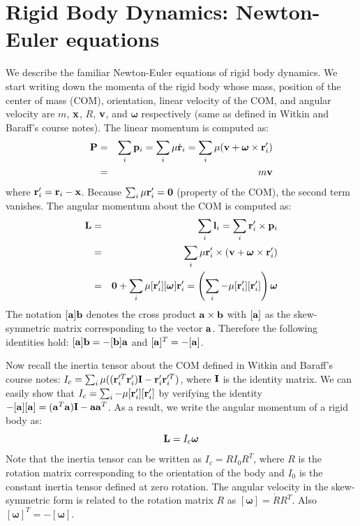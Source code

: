 \section{Rigid Body Dynamics: Newton-Euler equations}
We describe the familiar Newton-Euler equations of rigid body dynamics. We start writing down the
momenta of the rigid body whose mass, position of the center
of mass (COM), orientation,
linear velocity of the COM, and angular velocity are $m$, $\mathbf{x}$, $R$,
$\mathbf{v}$, and $\bm{\omega}$ respectively (same as defined in Witkin and
Baraff's course notes). The linear momentum  is computed as:
\begin{eqnarray}
\mathbf{P} &=& \sum_i \mathbf{p}_i = \sum_i \mathbf{\mu} \dot{\mathbf{r}}_i = \sum_i  \mathbf{\mu} (\mathbf{v} + \bm{\omega}
    \times \mathbf{r}_i') \nonumber \\
 &=& m \mathbf{v}
\end{eqnarray}
where $\mathbf{r}_i' = \mathbf{r}_i - \mathbf{x}$. Because $\sum_i \mathbf{\mu}
\mathbf{r}_i' = \mathbf{0}$ (property of the COM), the second term vanishes. The angular momentum  about the COM is computed as:
\begin{eqnarray}
\nonumber
\mathbf{L} & = & \sum_i \mathbf{l}_i  = \sum_i \mathbf{r}_i' \times \mathbf{p}_i\\
\nonumber
& = & \sum_i \mathbf{\mu} \mathbf{r}_i' \times (\mathbf{v} + \bm{\omega} \times \mathbf{r}_i')\\
&= & \mathbf{0} + \sum_i \mathbf{\mu} [\mathbf{r}_i'][\bm{\omega}]\mathbf{r}_i' = \left ( \sum_i -\mathbf{\mu} [\mathbf{r}_i'][\mathbf{r}_i'] \right )\bm{\omega}
\end{eqnarray}
The notation $[\mathbf{a}] \mathbf{b}$ denotes the cross product $\mathbf{a}\times \mathbf{b}$ with $[\mathbf{a}]$ as the skew-symmetric matrix corresponding to the vector $\mathbf{a}$. Therefore the following identities hold: $[\mathbf{a}]\mathbf{b} = -[\mathbf{b}]\mathbf{a}$ and $[\mathbf{a}]^T = -[\mathbf{a}]$.

Now recall the inertia tensor about the COM defined in Witkin and
Baraff's course notes: $I_c = \sum_i \mathbf{\mu} ((\mathbf{r}_i'^T
\mathbf{r}_i')\mathbf{I} - \mathbf{r}_i' \mathbf{r}_i'^T)$, where $\mathbf{I}$ is the
identity matrix. We can easily show that
$I_c = \sum_i -\mathbf{\mu} [\mathbf{r}_i'][\mathbf{r}_i']$ by verifying the
identity $-[\mathbf{a}][\mathbf{a}] = (\mathbf{a}^T\mathbf{a}) \mathbf{I}  -
\mathbf{a}\mathbf{a}^T$. As a result, we write the angular momentum of a rigid body as:
\begin{equation}
\mathbf{L} = I_c \bm{\omega}
\end{equation}
Note that the inertia tensor can be written as $I_c = RI_0R^T$, where $R$ is the rotation matrix corresponding to the orientation of the body and $I_0$ is the constant inertia tensor defined at zero rotation. The angular velocity in the skew-symmetric form is related to the rotation matrix $R$ as $[\bm{\omega}] = \dot{R}R^T$. Also $[\bm{\omega}]^T = -[\bm{\omega}]$.

